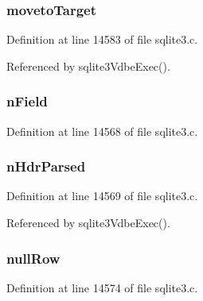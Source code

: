 \subsubsection[{moveto\+Target}]{ moveto\+Target}\label{struct_vdbe_cursor_a0684b330a73a8653f256e762327cb99b}


Definition at line 14583 of file sqlite3.\+c.



Referenced by sqlite3\+Vdbe\+Exec().

\hypertarget{struct_vdbe_cursor_a1755ad239f6e44f3faeb8126792fb5be}{}
\subsubsection[{n\+Field}]{ n\+Field}\label{struct_vdbe_cursor_a1755ad239f6e44f3faeb8126792fb5be}


Definition at line 14568 of file sqlite3.\+c.

\hypertarget{struct_vdbe_cursor_a852275cc9d48313d2fd65595c065cb74}{}
\subsubsection[{n\+Hdr\+Parsed}]{ n\+Hdr\+Parsed}\label{struct_vdbe_cursor_a852275cc9d48313d2fd65595c065cb74}


Definition at line 14569 of file sqlite3.\+c.



Referenced by sqlite3\+Vdbe\+Exec().

\hypertarget{struct_vdbe_cursor_a9997cf9a46ae166a735425897193bfb0}{}
\subsubsection[{null\+Row}]{ null\+Row}\label{struct_vdbe_cursor_a9997cf9a46ae166a735425897193bfb0}


Definition at line 14574 of file sqlite3.\+c.



